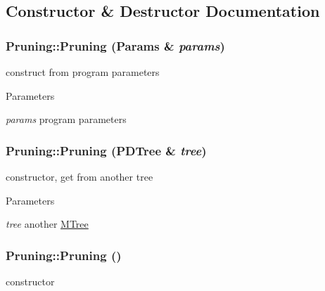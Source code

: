 \subsection{Constructor \& Destructor Documentation}
\hypertarget{classPruning_a020fa8f3cef1e1119e534c5b6f0c8fae}{
\subsubsection[{Pruning}]{\setlength{\rightskip}{0pt plus 5cm}Pruning::Pruning ({\bf Params} \& {\em params})}}
\label{classPruning_a020fa8f3cef1e1119e534c5b6f0c8fae}
construct from program parameters 
\begin{DoxyParams}{Parameters}
\item[{\em params}]program parameters \end{DoxyParams}
\hypertarget{classPruning_a4dd4ec835b284391a7260e3cd6b4491d}{
\subsubsection[{Pruning}]{\setlength{\rightskip}{0pt plus 5cm}Pruning::Pruning ({\bf PDTree} \& {\em tree})}}
\label{classPruning_a4dd4ec835b284391a7260e3cd6b4491d}
constructor, get from another tree 
\begin{DoxyParams}{Parameters}
\item[{\em tree}]another \hyperlink{classMTree}{MTree} \end{DoxyParams}
\hypertarget{classPruning_a71d6f0210e5083b0eded402c165431b7}{
\subsubsection[{Pruning}]{\setlength{\rightskip}{0pt plus 5cm}Pruning::Pruning ()}}
\label{classPruning_a71d6f0210e5083b0eded402c165431b7}
constructor 

